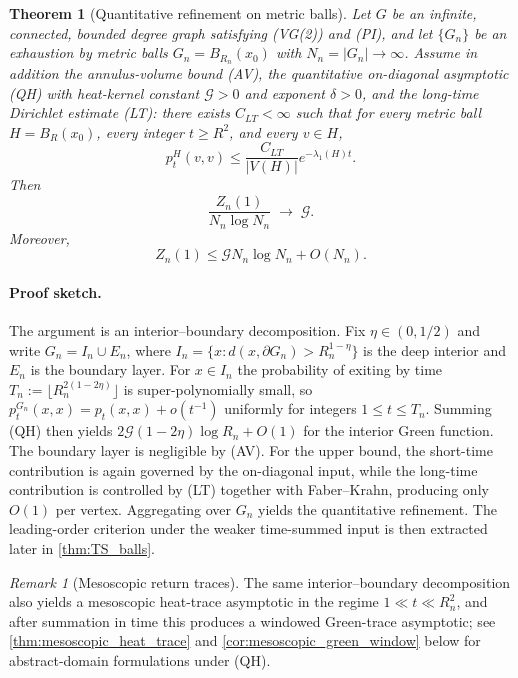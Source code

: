 \documentclass[reqno]{amsart}
\numberwithin{equation}{section}
\newtheorem{theorem}{Theorem}[section]
\theoremstyle{definition}
\theoremstyle{remark}
\newtheorem{remark}[remark]{Remark}
\newcommand{\Cref}[1]{\autoref{#1}}
\newcommand{\cG}{\mathcal{G}}
\begin{document}
\begin{theorem}[Quantitative refinement on metric balls]\label{thm:main}
Let $G$ be an infinite, connected, bounded degree graph satisfying (VG(2)) and (PI), and let $\{G_n\}$ be an exhaustion by metric balls $G_n=B_{R_n}(x_0)$ with $N_n=|G_n|\to\infty$. Assume in addition the annulus-volume bound (AV), the quantitative on-diagonal asymptotic (QH) with heat-kernel constant $\cG>0$ and exponent $\delta>0$, and the long-time Dirichlet estimate (LT): there exists $C_{LT}<\infty$ such that for every metric ball $H=B_R(x_0)$, every integer $t\ge R^2$, and every $v\in H$,
\[
  p_t^H(v,v)\le \frac{C_{LT}}{|V(H)|} e^{-\lambda_1(H)t}.
\]
Then
\[
  \frac{Z_n(1)}{N_n\log N_n}\;\longrightarrow\;\cG.
\]
Moreover,
\[
  Z_n(1)\le \cG N_n\log N_n+O(N_n).
\]
\end{theorem}

\paragraph{Proof sketch.} The argument is an interior--boundary decomposition. Fix $\eta\in(0,1/2)$ and write $G_n=I_n\cup E_n$, where $I_n=\{x: d(x,\partial G_n)>R_n^{1-\eta}\}$ is the deep interior and $E_n$ is the boundary layer. For $x\in I_n$ the probability of exiting by time $T_n:=\lfloor R_n^{2(1-2\eta)}\rfloor$ is super-polynomially small, so $p_t^{G_n}(x,x)=p_t(x,x)+o(t^{-1})$ uniformly for integers $1\le t\le T_n$. Summing \textup{(QH)} then yields $2\cG(1-2\eta)\log R_n+O(1)$ for the interior Green function. The boundary layer is negligible by \textup{(AV)}. For the upper bound, the short-time contribution is again governed by the on-diagonal input, while the long-time contribution is controlled by \textup{(LT)} together with Faber--Krahn, producing only $O(1)$ per vertex. Aggregating over $G_n$ yields the quantitative refinement. The leading-order criterion under the weaker time-summed input is then extracted later in \Cref{thm:TS_balls}.

\begin{remark}[Mesoscopic return traces]\label{cor:heat_trace}
The same interior--boundary decomposition also yields a mesoscopic heat-trace asymptotic in the regime $1\ll t\ll R_n^2$, and after summation in time this produces a windowed Green-trace asymptotic; see \Cref{thm:mesoscopic_heat_trace} and \Cref{cor:mesoscopic_green_window} below for abstract-domain formulations under \textup{(QH)}.
\end{remark}
\end{document}
